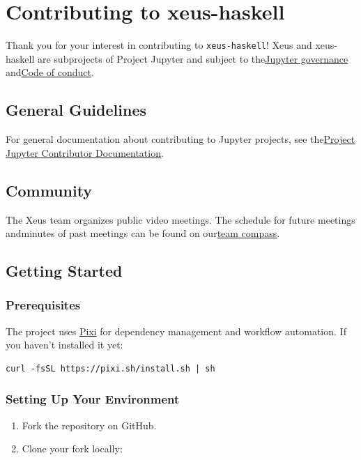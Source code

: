 \section{Contributing to xeus-haskell}
\label{sec:contributing}


Thank you for your interest in contributing to \texttt{xeus-haskell}!
Xeus and xeus-haskell are subprojects of Project Jupyter and subject to the\href{https://github.com/jupyter/governance}{Jupyter governance} and\href{https://github.com/jupyter/governance/blob/master/conduct/code\_of\_conduct.md}{Code of conduct}.
\subsection{General Guidelines}


For general documentation about contributing to Jupyter projects, see the\href{https://jupyter.readthedocs.io/en/latest/contributor/content-contributor.html}{Project Jupyter Contributor Documentation}.
\subsection{Community}


The Xeus team organizes public video meetings. The schedule for future meetings andminutes of past meetings can be found on our\href{https://jupyter-xeus.github.io/}{team compass}.
\subsection{Getting Started}


\subsubsection{Prerequisites}


The project uses \href{https://pixi.sh/}{Pixi} for dependency management and workflow automation. If you haven't installed it yet:
\begin{verbatim}
curl -fsSL https://pixi.sh/install.sh | sh
\end{verbatim}


\subsubsection{Setting Up Your Environment}


\begin{enumerate}
\item Fork the repository on GitHub.
\item Clone your fork locally:
\end{enumerate}



